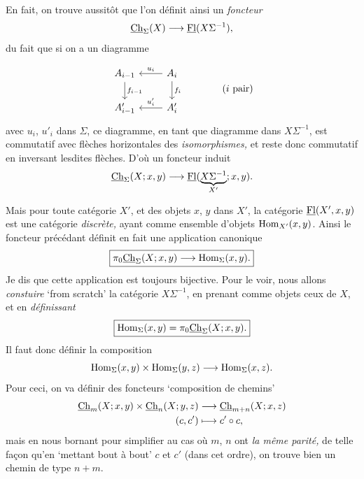 En fait, on trouve aussitôt que l'on définit ainsi un \textit{foncteur}
\[
\underline{\mathrm{Ch}}_\Sigma(X)\longrightarrow\underline{\mathrm{Fl}}(X\Sigma^{-1}),
\]
 du fait que si on a un diagramme

\[
\begin{tikzcd}
A_{i-1} \arrow[d, "f_{i-1}"] & A_i \arrow[l, "u_i"'] \arrow[d, "f_i"] \\
A'_{i-1} & A'_i \arrow[l, "u'_i"']
\end{tikzcd}
\qquad\qquad (i\text{ pair})
\]
avec $u_i$, $u'_i$ dans $\Sigma$, ce diagramme, en tant que diagramme dans $X\Sigma^{-1}$, est commutatif avec flèches horizontales des \textit{isomorphismes,} et reste donc commutatif en inversant lesdites flèches. D'où un foncteur induit
\[
\underline{\mathrm{Ch}}_\Sigma(X;x,y)\longrightarrow\underline{\mathrm{Fl}}(\underbrace{X\Sigma^{-1}}_{X'};x,y).
\]

Mais pour toute catégorie $X'$, et des objets $x$, $y$ dans $X'$, la catégorie $\underline{\mathrm{Fl}}(X',x,y)$ est
une catégorie \textit{discrète,} ayant comme ensemble d'objets $\mathrm{Hom}_{X'}(x,y)$. Ainsi le foncteur précédant définit en fait une application canonique %
\[
\boxed{\pi_0\underline{\mathrm{Ch}}_\Sigma(X;x,y)\longrightarrow\mathrm{Hom}_\Sigma(x,y).}
\]
Je dis que cette application est toujours bijective. Pour le voir, nous allons \textit{constuire} `from scratch' la catégorie $X\Sigma^{-1}$, en prenant comme objets ceux de $X$, et en \textit{définissant} %
\[
\boxed{\mathrm{Hom}_\Sigma(x,y)=\pi_0\underline{\mathrm{Ch}}_\Sigma(X;x,y).}
\]
Il faut donc définir la composition
\[
\mathrm{Hom}_\Sigma(x,y)\times\mathrm{Hom}_\Sigma(y,z)\longrightarrow\mathrm{Hom}_\Sigma(x,z).
\]
Pour ceci, on va définir des foncteurs `composition de chemins'
\[
\begin{aligned}
\underline{\mathrm{Ch}}_m(X;x,y)\times\underline{\mathrm{Ch}}_n(X;y,z) &\longrightarrow \underline{\mathrm{Ch}}_{m+n}(X;x,z)\\
(c,c') &\longmapsto c'\circ c,
\end{aligned}
\]
mais en nous bornant pour simplifier au cas où $m$, $n$ ont \textit{la même parité,} de telle façon qu'en `mettant bout à bout' $c$ et $c'$ (dans cet ordre), on trouve bien un chemin de type $n+m$.

